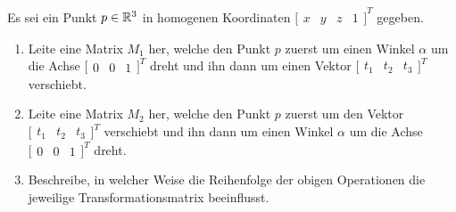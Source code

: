 \documentclass[headsepline, usegeometry]{scrreprt}
\begin{document}
\begin{exercise}   
    Es sei ein Punkt \(p \in \mathbb{R}^{3}\) in homogenen Koordinaten
    \( 
        {\big[
        \begin{matrix}
            x & y & z & 1
        \end{matrix}
        \big]}^{T}
    \)
    gegeben.
    \begin{enumerate}[label = (\alph*)]
        \item Leite eine Matrix \(M_{1}\) her, welche den Punkt \(p\) zuerst um einen Winkel \(\alpha\) um die Achse 
            \(
            \big[
            \begin{matrix}
                0 & 0 & 1
            \end{matrix}
            \big]
            ^{T}
            \)  
            dreht und ihn dann um einen Vektor
            \(
            \big[
            \begin{matrix}
                t_{1} & t_{2} & t_{3}
            \end{matrix}
            \big]
            ^{T}
            \) 
            verschiebt.\label{ex:2a}
        \item Leite eine Matrix \(M_{2}\) her, welche den Punkt \(p\) zuerst um den Vektor 
            \(
            \big[
            \begin{matrix}
                t_{1} & t_{2} & t_{3}
            \end{matrix}
            \big]
            ^{T}
            \) 
            verschiebt und ihn dann um einen Winkel \(\alpha\) um die Achse
            \(
            \big[
            \begin{matrix}
                0 & 0 & 1
            \end{matrix}
            \big]
            ^{T}
            \) 
            dreht.\label{ex:2b}
        \item Beschreibe, in welcher Weise die Reihenfolge der obigen Operationen die jeweilige Transformationsmatrix beeinflusst.\label{ex:2c}
    \end{enumerate}
\end{exercise}
\end{document}
